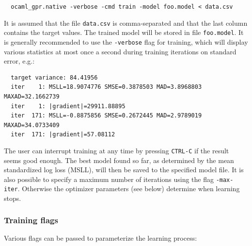 \documentclass[10pt]{report}
\begin{document}
\begin{verbatim}
  ocaml_gpr.native -verbose -cmd train -model foo.model < data.csv
\end{verbatim}

It is assumed that the file \verb=data.csv= is comma-separated and that the last
column contains the target values.  The trained model will be stored in file
\verb=foo.model=.  It is generally recommended to use the \verb=-verbose= flag
for training, which will display various statistics at most once a second during
training iterations on standard error, e.g.:

{\footnotesize
\begin{verbatim}
  target variance: 84.41956
  iter    1: MSLL=18.9074776 SMSE=0.3878503 MAD=3.8968803 MAXAD=32.1662739
  iter    1: |gradient|=29911.88895
  iter  171: MSLL=-0.8875856 SMSE=0.2672445 MAD=2.9789019 MAXAD=34.0733409
  iter  171: |gradient|=57.08112
\end{verbatim}
}

The user can interrupt training at any time by pressing \verb=CTRL-C= if the
result seems good enough.  The best model found so far, as determined by the
mean standardized log loss (MSLL), will then be saved to the specified model
file.  It is also possible to specify a maximum number of iterations using the
flag \verb=-max-iter=.  Otherwise the optimizer parameters (see below) determine
when learning stops.\\

\subsubsection{Training flags}

Various flags can be passed to parameterize the learning process:
\end{document}

